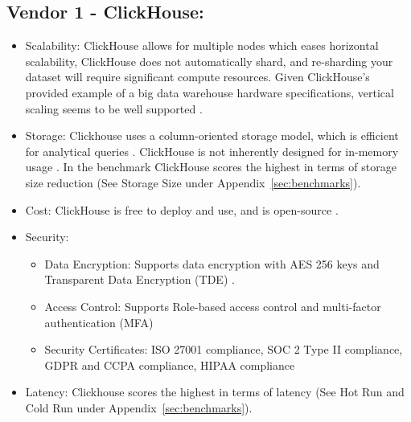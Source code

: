\subsection{Vendor 1 - ClickHouse:}
\begin{itemize}
    \item Scalability: ClickHouse allows for multiple nodes which eases horizontal scalability, 
    ClickHouse does not automatically shard, and re-sharding your dataset will require significant compute resources. \cite{clickhouseScaling}
    Given ClickHouse's provided example of a big data warehouse hardware specifications, vertical scaling seems to be well supported \cite{clickhouseScaling}.
    \item Storage: Clickhouse uses a column-oriented storage model, which is efficient for analytical queries \cite{clickhouseStorage}. ClickHouse is not inherently designed for in-memory usage \cite{clickhouseStorage}.
    In the benchmark ClickHouse scores the highest in terms of storage size reduction (See Storage Size under Appendix~\ref{sec:benchmarks}).
    \item Cost: ClickHouse is free to deploy and use, and is open-source \cite{clickhouseCost}.
    \item Security: 
    \begin{itemize}
        \item Data Encryption: Supports data encryption with AES 256 keys and Transparent Data Encryption (TDE) \cite{clickhouseSecurity}.
        \item Access Control: Supports Role-based access control and multi-factor authentication (MFA) \cite{clickhouseSecurity2}
        \item Security Certificates: ISO 27001 compliance, SOC 2 Type II compliance, GDPR and CCPA compliance, HIPAA compliance \cite{clickhouseSecurity2}
    \end{itemize}
    \item Latency: Clickhouse scores the highest in terms of latency (See Hot Run and Cold Run under Appendix~\ref{sec:benchmarks}).
\end{itemize}    
